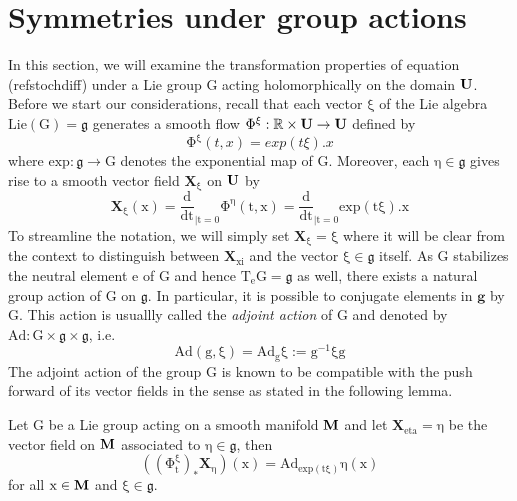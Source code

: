 \documentclass[10 pt,english]{smfart}
\newcommand{\G}{{\textrm{G}}}
\newcommand{\Xvec}{\mathrm{\mathbf{X}}}
\newcommand{\g}{\mathrm{\mathbf{g}}}
\newcommand{\U}{{\bf{U}}}
\newcommand{\M}{{\bf{M}}}
\begin{document}
\section{Symmetries under group actions}
In this section, we will examine the transformation properties of equation (ref{stochdiff}) under a Lie group $\mathrm{\G}$ acting holomorphically on the domain $\mathrm{\U}$. 
Before we start our considerations, recall that each vector $\mathrm{\xi}$ of the Lie algebra ${\mathrm{Lie}(\G)=\mathfrak{g}}$ generates a smooth flow $\mathrm{\Phi^{\xi}:\mathbb{R}\times\U\rightarrow\U}$
defined by 
\begin{equation}
\mathrm{\Phi^{\xi}}(t,x)=exp(t \xi).x
\end{equation} where $\mathrm{exp:\mathfrak{g}\rightarrow \G}$ denotes the exponential map of $\mathrm{\G}$. Moreover, each $\mathrm{\eta\in\mathfrak{g}}$ gives rise to a smooth vector field $\mathrm{\Xvec_{\xi}}$  on $\mathrm{\U}$ by 
\begin{equation}
\mathrm{\Xvec_{\xi}(x)=\frac{d}{dt}_{\vert t=0}\Phi^{\eta}(t,x)=\frac{d}{dt}_{\vert t=0}exp(t \xi).x}
\end{equation} To streamline the notation, we will simply set $\mathrm{\Xvec_{\xi}=\xi}$ where it will be clear from the context to distinguish between $\mathrm{\Xvec_{xi}}$ and the vector $\mathrm{\xi\in\mathfrak{g}}$
itself. As $\mathrm{\G}$ stabilizes the neutral element $\mathrm{e}$ of $\mathrm{\G}$ and hence $\mathrm{T_{e}\G=\mathfrak{g}}$ as well, there exists a natural group action of $\mathrm{\G}$
on $\mathrm{\mathfrak{g}}$. In particular, it is possible to conjugate elements in $\mathfrak{\g}$ by $\mathrm{\G}$. This action is usuallly called the \textit{adjoint action} of $\mathrm{\G}$ and denoted by 
$\mathrm{Ad:\G\times\mathfrak{g}\times\mathfrak{g}}$, i.e.
\begin{equation}
\mathrm{Ad(g,\xi)=Ad_{g}\xi:=g^{-1}\xi g}
\end{equation}
The adjoint action of the group $\mathrm{\G}$ is known to be compatible with the push forward of its vector fields in the sense as stated in the following lemma.
\begin{lemm}\label{adointaction} Let $\mathrm{\G}$ be a Lie group acting on a smooth manifold $\mathrm{\M}$ and let $\mathrm{\Xvec_{eta}=\eta}$ be the vector field on $\mathrm{\M}$ associated to $\mathrm{\eta\in\mathfrak{g}}$, then 
\begin{equation}
\mathrm{\left(\left(\Phi^{\xi}_{t}\right)_{*}\Xvec_{\eta}\right)(x)=Ad_{exp(t \xi)}\eta(x)}
\end{equation} for all $\mathrm{x\in\M}$ and $\mathrm{\xi\in\mathfrak{g}}$.
\end{lemm}
\end{document}
